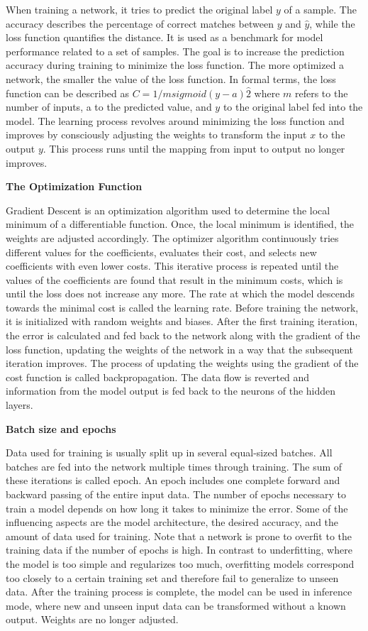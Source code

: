 When training a network, it tries to predict the original label $y$ of a sample. The accuracy describes the percentage of correct matches between $y$ and $\hat{y}$, while the loss function quantifies the distance. It is used as a benchmark for model performance related to a set of samples. The goal is to increase the prediction accuracy during training to minimize the loss function. The more optimized a network, the smaller the value of the loss function. 
In formal terms, the loss function can be described as 
${C = 1/m sigmoid (y-a)\hat{2}}$ where $m$ refers to the number of inputs, a to the predicted value, and $y$ to the original label fed into the model.
The learning process revolves around minimizing the loss function and improves by consciously adjusting the weights to transform the input $x$ to the output $y$. This process runs until the mapping from input to output no longer improves. 

\textbf{The Optimization Function}

Gradient Descent is an optimization algorithm used to determine the local minimum of a differentiable function. 
Once, the local minimum is identified, the weights are adjusted accordingly.
The optimizer algorithm continuously tries different values for the coefficients, evaluates their cost, and selects new coefficients with even lower costs. This iterative process is repeated until the values of the coefficients are found that result in the minimum costs, which is until the loss does not increase any more.
The rate at which the model descends towards the minimal cost is called the learning rate. Before training the network, it is initialized with random weights and biases. After the first training iteration, the error is calculated and fed back to the network along with the gradient of the loss function, updating the weights of the network in a way that the subsequent iteration improves. The process of updating the weights using the gradient of the cost function is called backpropagation. The data flow is reverted and information from the model output is fed back to the neurons of the hidden layers.

\textbf{Batch size and epochs}

Data used for training is usually split up in several equal-sized batches. All batches are fed into the network multiple times through training. The sum of these iterations is called epoch. An epoch includes one complete forward and backward passing of the entire input data.
The number of epochs necessary to train a model depends on how long it takes to minimize the error. Some of the influencing aspects are the model architecture, the desired accuracy, and the amount of data used for training.
Note that a network is prone to overfit to the training data if the number of epochs is high. In contrast to underfitting, where the model is too simple and regularizes too much, overfitting models correspond too closely to a certain training set and therefore fail to generalize to unseen data. 
After the training process is complete, the model can be used in inference mode, where new and unseen input data can be transformed without a known output. Weights are no longer adjusted.


